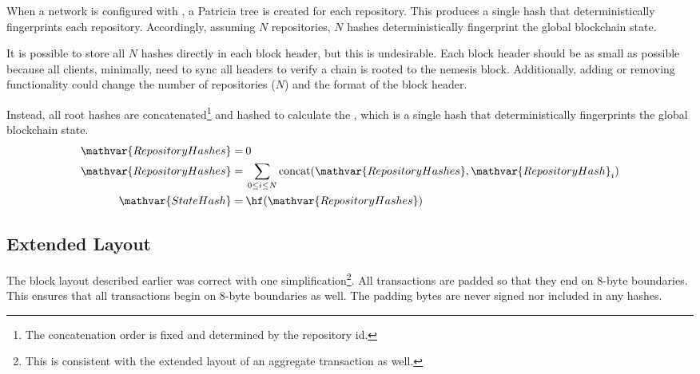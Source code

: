 When a network is configured with , a Patricia tree is created for each repository.
This produces a single hash that deterministically fingerprints each repository.
Accordingly, assuming $N$ repositories, $N$ hashes deterministically fingerprint the global blockchain state.

It is possible to store all $N$ hashes directly in each block header, but this is undesirable.
Each block header should be as small as possible because all clients, minimally, need to sync all headers to verify a chain is rooted to the nemesis block.
Additionally, adding or removing functionality could change the number of repositories ($N$) and the format of the block header.

Instead, all root hashes are concatenated\footnote{The concatenation order is fixed and determined by the repository id.} and hashed to calculate the ,
which is a single hash that deterministically fingerprints the global blockchain state.
\begin{align*}
	\mathvar{RepositoryHashes} = \: & 0 \\
	\mathvar{RepositoryHashes} = \: & \sum_{0\leq i \leq N} \mathfunc{concat}(\mathvar{RepositoryHashes}, \mathvar{RepositoryHash}_i) \\
	\mathvar{StateHash} = \: & \hf(\mathvar{RepositoryHashes})
\end{align*}

\subsection{Extended Layout}

The block layout described earlier was correct with one simplification\footnote{
This is consistent with the extended layout of an aggregate transaction as well.}.
All transactions are padded so that they end on 8-byte boundaries.
This ensures that all transactions begin on 8-byte boundaries as well.
The padding bytes are never signed nor included in any hashes.

\begin{figure}[H]
\end{figure}
